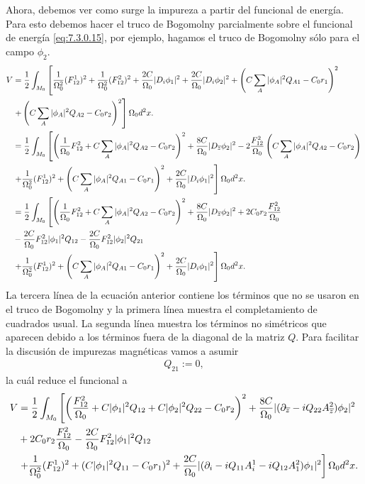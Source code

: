Ahora, debemos ver como surge la impureza a partir del funcional de energía. Para esto debemos hacer el truco de Bogomolny parcialmente sobre el funcional de energía \eqref{eq:7.3.0.15}, por ejemplo, hagamos el truco de Bogomolny sólo para el campo $\phi_2$.
\begin{align}
	V & = \frac{1}{2}\int_{M_0}\left[\frac{1}{\Omega_0^2}(F_{12}^1)^2+\frac{1}{\Omega_0^2}(F_{12}^2)^2+\frac{2C}{\Omega_0}|D_i\phi_1|^2+\frac{2C}{\Omega_0}|D_i\phi_2|^2+\left(C\sum_A|\phi_A|^2Q_{A1}-C_0r_1\right)^2\right.\nonumber         \\
	  & \left.+\left(C\sum_A|\phi_A|^2Q_{A2}-C_0r_2\right)^2\right]\Omega_0d^2x.\nonumber                                                                                                                         \\
	  & =\frac{1}{2}\int_{M_0}\left[\left(\frac{1}{\Omega_0}F_{12}^2+C\sum_A|\phi_A|^2Q_{A2}-C_0r_2\right)^2+\frac{8C}{\Omega_0}|D_{\overline z}\phi_2|^2-2\frac{F_{12}^2}{\Omega_0}\left(C\sum_A|\phi_A|^2Q_{A2}-C_0r_2\right)\right.\nonumber \\
	  & \left.+\frac{1}{\Omega_0^2}(F_{12}^1)^2+\left(C\sum_A|\phi_A|^2Q_{A1}-C_0r_1\right)^2+\frac{2C}{\Omega_0}|D_i\phi_1|^2\right]\Omega_0d^2x.\nonumber                                                                    \\
	  & =\frac{1}{2}\int_{M_0}\left[\left(\frac{1}{\Omega_0}F_{12}^2+C\sum_A|\phi_A|^2Q_{A2}-C_0r_2\right)^2+\frac{8C}{\Omega_0}|D_{\overline z}\phi_2|^2+2C_0r_2\frac{F_{12}^2}{\Omega_0}\right.\nonumber                              \\
	  & -\frac{2C}{\Omega_0}F_{12}^2|\phi_1|^2Q_{12}-\frac{2C}{\Omega_0}F_{12}^2|\phi_2|^2Q_{21}\nonumber                                                                                                          \\
	  & \left.+\frac{1}{\Omega_0^2}(F_{12}^1)^2+\left(C\sum_A|\phi_A|^2Q_{A1}-C_0r_1\right)^2+\frac{2C}{\Omega_0}|D_i\phi_1|^2\right]\Omega_0d^2x.\
\end{align}
La tercera línea de la ecuación anterior contiene los términos que no se usaron en el truco de Bogomolny y la primera línea muestra el completamiento de cuadrados usual. La segunda línea muestra los términos no simétricos que aparecen debido a los términos fuera de la diagonal de la matriz $Q$. Para facilitar la discusión de impurezas magnéticas vamos a asumir
\begin{align}
	Q_{21} := 0,
\end{align}
la cuál reduce el funcional a
\begin{align}
	V & = \frac{1}{2}\int_{M_0}\left[\left(\frac{F_{12}^2}{\Omega_0}+C|\phi_1|^2Q_{12}+C|\phi_2|^2Q_{22}-C_0r_2\right)^2+\frac{8C}{\Omega_0}|(\partial_{\overline z}-iQ_{22}A_{\overline z}^2)\phi_2|^2\right.\nonumber \\
	  & +2C_0r_2\frac{F_{12}^2}{\Omega_0}-\frac{2C}{\Omega_0}F_{12}^2|\phi_1|^2Q_{12}\nonumber                                                                                                       \\
	  & \left.+\frac{1}{\Omega_0^2}(F_{12}^1)^2+(C|\phi_1|^2Q_{11}-C_0r_1)^2+\frac{2C}{\Omega_0}|(\partial_i-iQ_{11}A_i^1-iQ_{12}A_1^2)\phi_1|^2\right]\Omega_0 d^2x.
\end{align}
